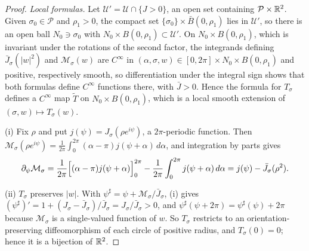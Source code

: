 \begin{proof}
\emph{Local formulas.} Let $\mathcal U'=\mathcal U\cap\{J>0\}$, an open set containing
$\mathcal P\times\mathbb{R}^2$. Given $\sigma_0\in\mathcal P$ and $\rho_1>0$, the compact set
$\{\sigma_0\}\times\bar B(0,\rho_1)$ lies in $\mathcal U'$, so there is an open ball $N_0\ni\sigma_0$ with
$N_0\times B(0,\rho_1)\subset\mathcal U'$. On $N_0\times B(0,\rho_1)$, which is invariant under the
rotations of the second factor, the integrands defining $\bar J_\sigma(|w|^2)$ and $\mathcal M_\sigma(w)$ are
$C^\infty$ in $(\alpha,\sigma,w)\in[0,2\pi]\times N_0\times B(0,\rho_1)$ and positive, respectively smooth, so
differentiation under the integral sign shows that both formulas define $C^\infty$ functions there, with
$\bar J>0$. Hence the formula for $T_\sigma$ defines a $C^\infty$ map $\tilde T$ on
$N_0\times B(0,\rho_1)$, which is a local smooth extension of $(\sigma,w)\mapsto T_\sigma(w)$.

(i) Fix $\rho$ and put $j(\psi)=J_\sigma(\rho e^{i\psi})$, a $2\pi$-periodic function. Then
$\mathcal M_\sigma(\rho e^{i\psi})=\frac1{2\pi}\int_0^{2\pi}(\alpha-\pi)j(\psi+\alpha)\,d\alpha$, and integration by
parts gives
\[
 \partial_\psi\mathcal M_\sigma=\frac1{2\pi}\Bigl[(\alpha-\pi)j(\psi+\alpha)\Bigr]_0^{2\pi}
 -\frac1{2\pi}\int_0^{2\pi}j(\psi+\alpha)\,d\alpha=j(\psi)-\bar J_\sigma(\rho^2).
\]

(ii) $T_\sigma$ preserves $|w|$. With $\psi^\sharp=\psi+\mathcal M_\sigma/\bar J_\sigma$, (i) gives
$(\psi^\sharp)'=1+(J_\sigma-\bar J_\sigma)/\bar J_\sigma=J_\sigma/\bar J_\sigma>0$, and $\psi^\sharp(\psi+2\pi)=\psi^\sharp(\psi)+2\pi$
because $\mathcal M_\sigma$ is a single-valued function of $w$. So $T_\sigma$ restricts to an
orientation-preserving diffeomorphism of each circle of positive radius, and $T_\sigma(0)=0$; hence it is a
bijection of $\mathbb{R}^2$.


\end{proof}
